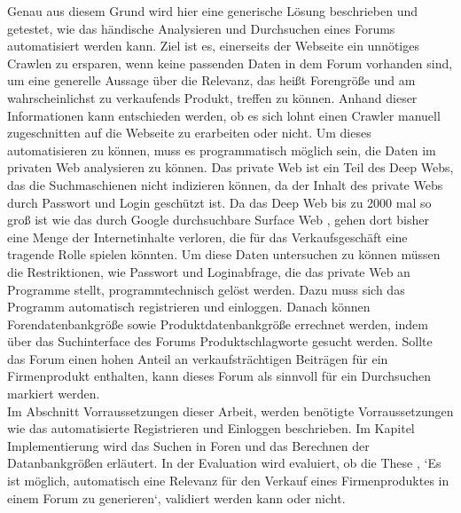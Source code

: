 Genau aus diesem Grund wird hier eine generische Lösung beschrieben und getestet, wie das händische Analysieren und Durchsuchen eines Forums automatisiert werden kann. Ziel ist es, einerseits der Webseite ein unnötiges Crawlen zu ersparen, wenn keine passenden Daten in dem Forum vorhanden sind, um eine generelle Aussage über die Relevanz, das heißt Forengröße und am wahrscheinlichst zu verkaufends Produkt, treffen zu können. Anhand dieser Informationen kann entschieden werden, ob es sich lohnt einen Crawler manuell zugeschnitten auf die Webseite zu erarbeiten oder nicht.
Um dieses automatisieren zu können, muss es programmatisch möglich sein, die Daten im privaten Web analysieren zu können. Das private Web ist ein Teil des Deep Webs, das die Suchmaschienen nicht indizieren können, da der Inhalt des private Webs durch Passwort und Login geschützt ist. Da das Deep Web bis zu 2000 mal so groß ist wie das durch Google durchsuchbare Surface Web \cite{gupta2014comparative}, gehen dort bisher eine Menge der Internetinhalte verloren, die für das Verkaufsgeschäft eine tragende Rolle spielen könnten. Um diese Daten untersuchen zu können müssen die Restriktionen, wie Passwort und Loginabfrage, die das private Web an Programme stellt, programmtechnisch gelöst werden. Dazu muss sich das Programm automatisch registrieren und einloggen. Danach können Forendatenbankgröße sowie Produktdatenbankgröße errechnet werden, indem über das Suchinterface des Forums Produktschlagworte gesucht werden. Sollte das Forum einen hohen Anteil an verkaufsträchtigen Beiträgen für ein Firmenprodukt enthalten, kann dieses Forum als sinnvoll für ein Durchsuchen markiert werden.\\
Im Abschnitt Vorraussetzungen dieser Arbeit, werden benötigte Vorraussetzungen wie das automatisierte Registrieren und Einloggen beschrieben.  Im Kapitel Implementierung wird das Suchen in Foren und das Berechnen der Datanbankgrößen erläutert. In der Evaluation wird evaluiert, ob die These , `Es ist möglich, automatisch eine Relevanz für den Verkauf eines Firmenproduktes in einem Forum zu generieren`, validiert werden kann oder nicht.
\newpage